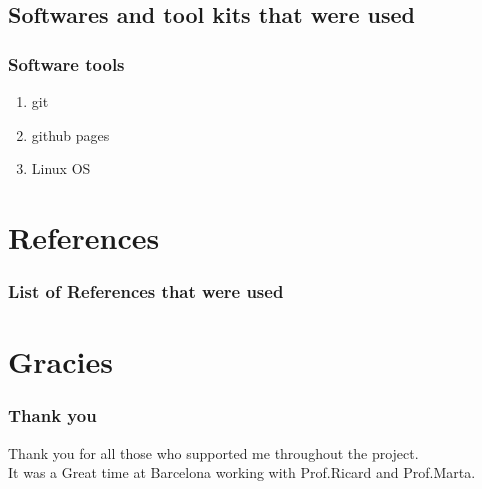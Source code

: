 \documentclass{beamer}
\begin{document}
\subsection{Softwares and tool kits that were used}

\frame
{
	\frametitle{Software tools}
	\begin{enumerate}
		\item git
		\item github pages
		\item Linux OS
	\end{enumerate}
}



\section{References}

\frame
{
	\frametitle{List of References that were used}


{}
}

\section{Gracies}
\frame
{
	\frametitle{Thank you}
Thank you for all those who supported me throughout the project.\\
It was a Great time at Barcelona working with Prof.Ricard and Prof.Marta.

}
\end{document}

